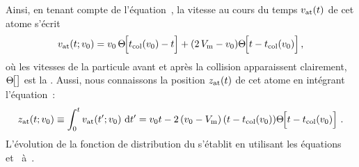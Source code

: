 \noindent
Ainsi, en tenant compte de l'équation~, la vitesse au cours du temps $v_{\mathrm {at}}(t)$ de cet atome s'écrit
\begin{equation}
	\vat(t; \vini) = 
	{\vini\,\Heaviside{\tcol(\vini)-t}}
	+ 
	{(2\, \Vmir - \vini) \Heaviside{t-\tcol(\vini)}}
	\virguleformule
	\label{eq:vtAtomeReflexion}
\end{equation}
où les vitesses de la particule %
{avant} et %
{après} la collision apparaissent clairement, $\Heaviside{}$ est la . 
Aussi, nous connaissons la position $z_{\mathrm {at}}(t)$ de cet atome en intégrant l'équation~:
\begin{equation}
	\zat(t; \vini) \equiv \IntegraleBornes{\vat(t'; \vini)}{\ddint t'}{0}{t} = \vini t - 2\,(\vini-\Vmir)\,(t-\tcol(\vini)) \Heaviside{t-\tcol(\vini)}
	\pointformule
	\label{eq:ztAtomeReflexion}
\end{equation}
L'évolution de la fonction de distribution du \pat s'établit en utilisant les équations~ et~ à~. 
%
\EnFaitNon
